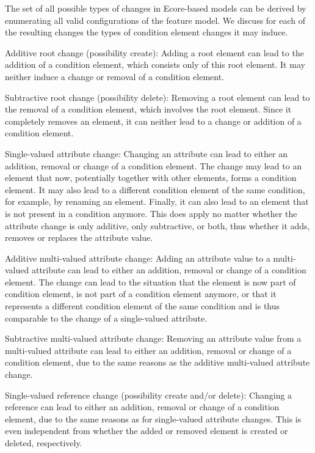 The set of all possible types of changes in Ecore-based models can be derived by enumerating all valid configurations of the feature model.
We discuss for each of the resulting changes the types of condition element changes it may induce.
\begin{properdescription}
    \item[Additive root change (possibility create):] Adding a root element can lead to the addition of a condition element, which consists only of this root element. It may neither induce a change or removal of a condition element.
    \item[Subtractive root change (possibility delete):] Removing a root element can lead to the removal of a condition element, which involves the root element. Since it completely removes an element, it can neither lead to a change or addition of a condition element.
    \item[Single-valued attribute change:] Changing an attribute can lead to either an addition, removal or change of a condition element. The change may lead to an element that now, potentially together with other elements, forms a condition element. It may also lead to a different condition element of the same condition, for example, by renaming an element. Finally, it can also lead to an element that is not present in a condition anymore. This does apply no matter whether the attribute change is only additive, only subtractive, or both, thus whether it adds, removes or replaces the attribute value.
    \item[Additive multi-valued attribute change:] Adding an attribute value to a multi-valued attribute can lead to either an addition, removal or change of a condition element. The change can lead to the situation that the element is now part of condition element, is not part of a condition element anymore, or that it represents a different condition element of the same condition and is thus comparable to the change of a single-valued attribute.
    \item[Subtractive multi-valued attribute change:] Removing an attribute value from a multi-valued attribute can lead to either an addition, removal or change of a condition element, due to the same reasons as the additive multi-valued attribute change.
    \item[Single-valued reference change (possibility create and/or delete):] Changing a reference can lead to either an addition, removal or change of a condition element, due to the same reasons as for single-valued attribute changes. This is even independent from whether the added or removed element is created or deleted, respectively.

\end{properdescription}
